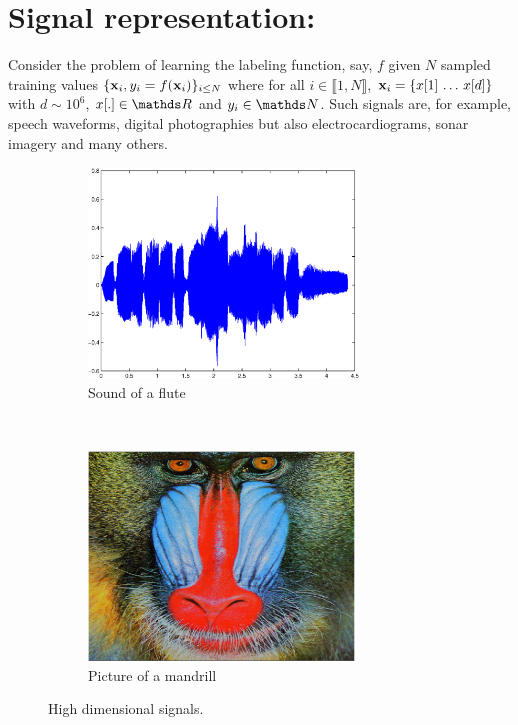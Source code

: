 \documentclass[a4paper,11pt]{report}
\begin{document}
	\section{Signal representation:}
		\label{sec:Intro/Need}
				
		Consider the problem of learning the labeling function, say, $f$ given $N$ sampled training values $\{{\bf x}_{i}, y_{i}=f({\bf x}_{i})\}_{i\leq N}$ where  for all $i \in \llbracket 1 , N \rrbracket$, ${\bf x}_{i} =\{ x[1] \, \dots \, x[d] \}$ with $d \sim 10^{6}$, $x[.] \in \dsR$ and $y_{i} \in \dsN$. Such signals are, for example, speech waveforms, digital photographies but also electrocardiograms, sonar imagery and many others.\\

		\begin{figure}[h]
			\centering
			\begin{subfigure}[t]{0.48\textwidth}
				\centering
				\includegraphics[height=2.2in]{waveform_flute.eps}
				\caption{Sound of a flute}
			\end{subfigure}%
			~ 
			\begin{subfigure}[t]{0.48\textwidth}
        \centering
        \includegraphics[height=2.2in]{im_mandrill.eps}
        \caption{Picture of a mandrill}
			\end{subfigure}
			\caption{High dimensional signals.}
			\label{fig:highDim signals}
		\end{figure}
		
\end{document}
